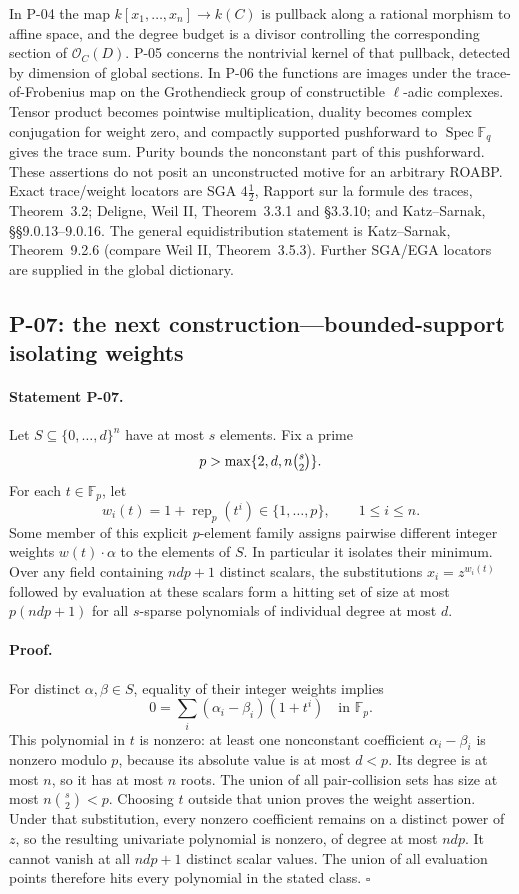 \documentclass[11pt,a4paper]{article}
\theoremstyle{definition}\newtheorem{definition}{Definition}
\begin{document}
In P-04 the map $k[x_1,\ldots,x_n]\to k(C)$ is pullback along a rational morphism to affine space, and the degree budget is a divisor controlling the corresponding section of $\mathcal O_C(D)$. P-05 concerns the nontrivial kernel of that pullback, detected by dimension of global sections. In P-06 the functions are images under the trace-of-Frobenius map on the Grothendieck group of constructible $\ell$-adic complexes. Tensor product becomes pointwise multiplication, duality becomes complex conjugation for weight zero, and compactly supported pushforward to $\operatorname{Spec}\mathbb F_q$ gives the trace sum. Purity bounds the nonconstant part of this pushforward. These assertions do not posit an unconstructed motive for an arbitrary ROABP. Exact trace/weight locators are SGA $4\frac12$, Rapport sur la formule des traces, Theorem~3.2; Deligne, Weil II, Theorem~3.3.1 and \S3.3.10; and Katz--Sarnak, \S\S9.0.13--9.0.16. The general equidistribution statement is Katz--Sarnak, Theorem~9.2.6 (compare Weil II, Theorem~3.5.3). Further SGA/EGA locators are supplied in the global dictionary.

\subsection{P-07: the next construction---bounded-support isolating weights}
\paragraph{Statement P-07.}
Let $S\subseteq\{0,\ldots,d\}^n$ have at most $s$ elements. Fix a prime
\[
 p>\max\{2,d,n\tbinom{s}{2}\}.
\]
For each $t\in\mathbb F_p$, let
\[
 w_i(t)=1+\operatorname{rep}_p(t^i)\in\{1,\ldots,p\},\qquad 1\le i\le n.
\]
Some member of this explicit $p$-element family assigns pairwise different integer weights $w(t)\cdot\alpha$ to the elements of $S$. In particular it isolates their minimum. Over any field containing $ndp+1$ distinct scalars, the substitutions $x_i=z^{w_i(t)}$ followed by evaluation at these scalars form a hitting set of size at most $p(ndp+1)$ for all $s$-sparse polynomials of individual degree at most $d$.
\paragraph{Proof.}
For distinct $\alpha,\beta\in S$, equality of their integer weights implies
\[
 0=\sum_i(\alpha_i-\beta_i)(1+t^i)\quad\text{in }\mathbb F_p.
\]
This polynomial in $t$ is nonzero: at least one nonconstant coefficient $\alpha_i-\beta_i$ is nonzero modulo $p$, because its absolute value is at most $d<p$. Its degree is at most $n$, so it has at most $n$ roots. The union of all pair-collision sets has size at most $n\binom{s}{2}<p$. Choosing $t$ outside that union proves the weight assertion. Under that substitution, every nonzero coefficient remains on a distinct power of $z$, so the resulting univariate polynomial is nonzero, of degree at most $ndp$. It cannot vanish at all $ndp+1$ distinct scalar values. The union of all evaluation points therefore hits every polynomial in the stated class. $\square$
\end{document}
